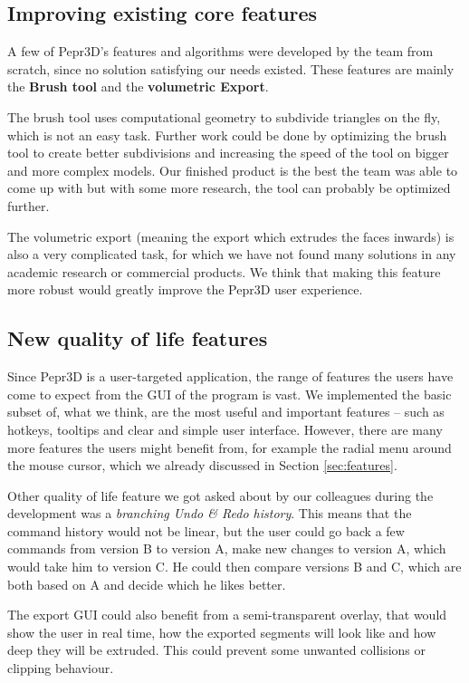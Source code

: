 \subsection{Improving existing core features}

A few of Pepr3D's features and algorithms were developed by the team from scratch, since no solution satisfying our needs existed. These features are mainly the \textbf{Brush tool} and the \textbf{volumetric Export}. 

The brush tool uses computational geometry to subdivide triangles on the fly, which is not an easy task. Further work could be done by optimizing the brush tool to create better subdivisions and increasing the speed of the tool on bigger and more complex models. Our finished product is the best the team was able to come up with but with some more research, the tool can probably be optimized further.

The volumetric export (meaning the export which extrudes the faces inwards) is also a very complicated task, for which we have not found many solutions in any academic research or commercial products. We think that making this feature more robust would greatly improve the Pepr3D user experience.

\subsection{New quality of life features}

Since Pepr3D is a user-targeted application, the range of features the users have come to expect from the GUI of the program is vast. We implemented the basic subset of, what we think, are the most useful and important features -- such as hotkeys, tooltips and clear and simple user interface. However, there are many more features the users might benefit from, for example the radial menu around the mouse cursor, which we already discussed in Section \ref{sec:features}.

Other quality of life feature we got asked about by our colleagues during the development was a \textit{branching Undo \& Redo history}. This means that the command history would not be linear, but the user could go back a few commands from version B to version A, make new changes to version A, which would take him to version C. He could then compare versions B and C, which are both based on A and decide which he likes better.

The export GUI could also benefit from a semi-transparent overlay, that would show the user in real time, how the exported segments will look like and how deep they will be extruded. This could prevent some unwanted collisions or clipping behaviour.

